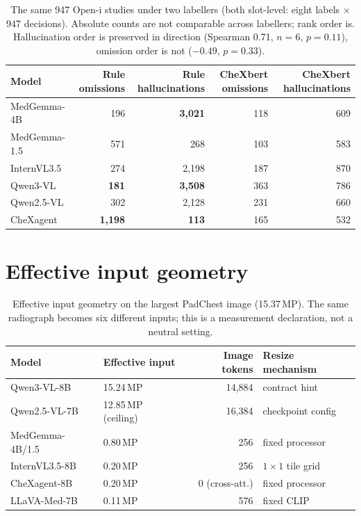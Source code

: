 \begin{table}[H]
\centering
\small
\caption{The same 947 Open-i studies under two labellers (both slot-level: eight labels $\times$ 947 decisions). Absolute counts are not comparable across labellers; rank order is. Hallucination order is preserved in direction (Spearman 0.71, $n=6$, $p=0.11$), omission order is not ($-0.49$, $p=0.33$).}
\label{tab:chexbert}
\begin{tabular}{lrrrr}
\toprule
Model & Rule omissions & Rule hallucinations & CheXbert omissions & CheXbert hallucinations \\
\midrule
MedGemma-4B & 196 & \textbf{3,021} & 118 & 609 \\
MedGemma-1.5 & 571 & 268 & 103 & 583 \\
InternVL3.5 & 274 & 2,198 & 187 & 870 \\
Qwen3-VL & \textbf{181} & \textbf{3,508} & 363 & 786 \\
Qwen2.5-VL & 302 & 2,128 & 231 & 660 \\
CheXagent & \textbf{1,198} & \textbf{113} & 165 & 532 \\
\bottomrule
\end{tabular}
\end{table}

\section{Effective input geometry}
\label{app:geometry}

\begin{table}[H]
\centering
\small
\caption{Effective input geometry on the largest PadChest image (15.37\,MP). The same radiograph becomes six different inputs; this is a measurement declaration, not a neutral setting.}
\label{tab:geometry}
\begin{tabular}{llrl}
\toprule
Model & Effective input & Image tokens & Resize mechanism \\
\midrule
Qwen3-VL-8B & 15.24\,MP & 14,884 & contract hint \\
Qwen2.5-VL-7B & 12.85\,MP (ceiling) & 16,384 & checkpoint config \\
MedGemma-4B/1.5 & 0.80\,MP & 256 & fixed processor \\
InternVL3.5-8B & 0.20\,MP & 256 & $1\times1$ tile grid \\
CheXagent-8B & 0.20\,MP & 0 (cross-att.) & fixed processor \\
LLaVA-Med-7B & 0.11\,MP & 576 & fixed CLIP \\
\bottomrule
\end{tabular}
\end{table}

